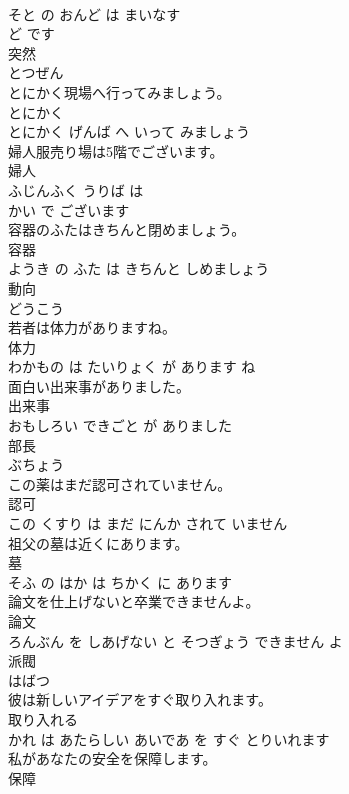 \documentclass[8pt]{extreport}
\begin{document}
\begin{CJK}{UTF8}{min}
\\	そと の おんど は まいなす 
\\	ど です			
\\	突然	
\\	とつぜん		
\\	とにかく現場へ行ってみましょう。	
\\	とにかく 
\\	とにかく げんば へ いって みましょう			
\\	婦人服売り場は5階でございます。	
\\	婦人 
\\	ふじんふく うりば は 
\\	かい で ございます			
\\	容器のふたはきちんと閉めましょう。	
\\	容器 
\\	ようき の ふた は きちんと しめましょう			
\\	動向	
\\	どうこう		
\\	若者は体力がありますね。	
\\	体力 
\\	わかもの は たいりょく が あります ね			
\\	面白い出来事がありました。	
\\	出来事 
\\	おもしろい できごと が ありました			
\\	部長	
\\	ぶちょう		
\\	この薬はまだ認可されていません。	
\\	認可 
\\	この くすり は まだ にんか されて いません			
\\	祖父の墓は近くにあります。	
\\	墓 
\\	そふ の はか は ちかく に あります			
\\	論文を仕上げないと卒業できませんよ。	
\\	論文 
\\	ろんぶん を しあげない と そつぎょう できません よ			
\\	派閥	
\\	はばつ		
\\	彼は新しいアイデアをすぐ取り入れます。	
\\	取り入れる 
\\	かれ は あたらしい あいであ を すぐ とりいれます			
\\	私があなたの安全を保障します。	
\\	保障 

\end{CJK}
\end{document}
